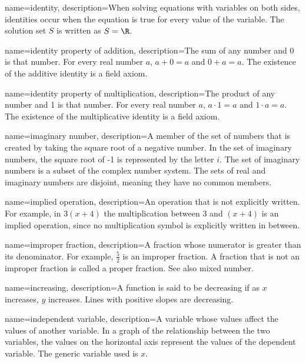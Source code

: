  {
	name=identity,
	description={When solving equations with variables on both sides, identities occur when the equation is true for every value of the variable. The solution set $S$ is written as $S=\R$.}
}

 {
	name=identity property of addition,
	description={The sum of any number and 0 is that number. For every real number $a$, $a + 0 = a$ and $0 + a = a$. The existence of the \gls{additive identity} is a \gls{field axiom}.}
}

 {
	name=identity property of multiplication,
	description={The product of any number and 1 is that number. For every real number $a$, $a \cdot 1 = a$ and $1 \cdot a = a$. The existence of the multiplicative identity is a \gls{field axiom}.}
}

 {
	name=imaginary number,
	description={A member of the set of numbers that is created by taking the square root of a negative number. In the set of imaginary numbers, the square root of -1 is represented by the letter $i$. The set of imaginary numbers is a subset of the complex number system. The sets of real and imaginary numbers are disjoint, meaning they have no common members.}
}

 {
	name=implied operation,
	description={An operation that is not explicitly written. For example, in $3 (x + 4)$ the multiplication between 3 and $(x + 4)$ is an implied operation, since no multiplication symbol is explicitly written in between.}
}

 {
	name=improper fraction,
	description={A fraction whose \gls{numerator} is greater than its \gls{denominator}. For example, $\frac{5}{2}$ is an improper fraction. A fraction that is not an improper fraction is called a \gls{proper fraction}. See also \gls{mixed number}.}
}

 {
	name=increasing,
	description={A function is said to be decreasing if as $x$ increases, $y$ increases. Lines with positive slopes are decreasing.}
}

 {
	name=independent variable,
	description={A variable whose values affect the values of another variable. In a graph of the relationship between the two variables, the values on the horizontal axis represent the values of the dependent variable. The generic variable used is $x$.}
}


